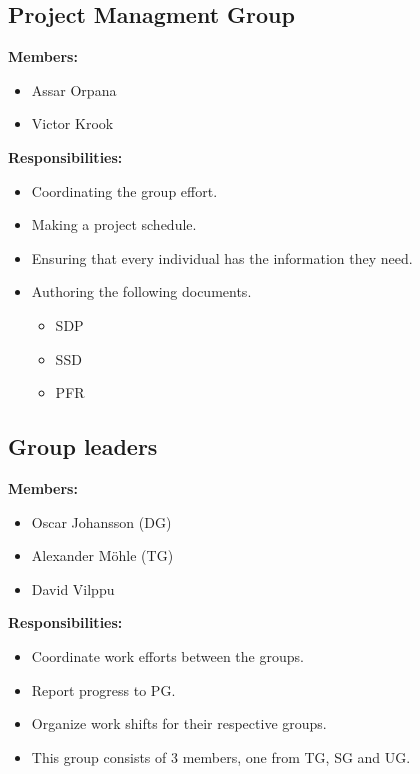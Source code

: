 \documentclass{article}
\begin{document}
    \subsection{Project Managment Group}
        \textbf{Members:}
        \begin{itemize}
            \item Assar Orpana
            \item Victor Krook
        \end{itemize}
        \textbf{Responsibilities:}
        \begin{itemize}
            \item Coordinating the group effort.
            \item Making a project schedule.
            \item Ensuring that every individual has the information they need.
            \item Authoring the following documents.
                \begin{itemize}
                    \item SDP
                    \item SSD
                    \item PFR
                \end{itemize} 
        \end{itemize}
    
    \subsection{Group leaders}
        \textbf{Members: }
        \begin{itemize}
            \item Oscar Johansson (DG)
            \item Alexander Möhle (TG)
            \item David Vilppu
        \end{itemize}
        \textbf{Responsibilities: }
        \begin{itemize}
            \item Coordinate work efforts between the groups. 
            \item Report progress to PG.
            \item Organize work shifts for their respective groups. 
            \item This group consists of 3 members, one from TG, SG and UG. 
        \end{itemize}
        
\end{document}
